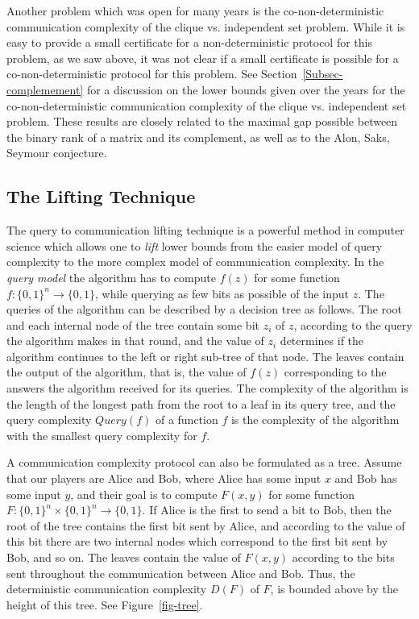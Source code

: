 \documentclass[11pt]{article}
\begin{document}
Another problem which was open for many years is the co-non-deterministic communication complexity of
the clique vs. independent set problem. While it is easy to provide a small certificate for a non-deterministic protocol for this problem, as we saw above,
it was not clear if a small certificate is possible for a co-non-deterministic protocol for this problem.
See Section~\ref{Subsec-complemement} for a discussion on the lower bounds given over the years for the co-non-deterministic communication complexity of
the clique vs. independent set problem. These results are closely related to the maximal gap possible between the binary rank of a matrix and its complement,
as well as to the Alon, Saks, Seymour conjecture.


\subsection{The Lifting Technique}
\label{subsec-lifting}
The query to communication lifting technique is a powerful method in computer science which allows one to {\em lift} lower bounds from the easier model of query complexity
to the more complex model of communication complexity.
In the {\em query model} the algorithm has to compute $f(z)$ for some function $f:\{0,1\}^n \rightarrow \{0,1\}$, while querying as few bits as possible of the input $z$.
The queries of the algorithm can be described by a decision tree as follows.
The root and each internal node of the tree contain some bit $z_i$ of $z$, according to the query the algorithm makes in that round,
and the value of $z_i$ determines if the algorithm continues to the left or right sub-tree of that node.
The leaves contain the output of the algorithm, that is, the value of $f(z)$ corresponding to the answers the algorithm received for its queries.
The complexity of the algorithm is the length of the longest path from the root to a leaf in its query tree, and the query complexity $Query(f)$ of a function $f$
is the complexity of the algorithm with the smallest query complexity for $f$.

A communication complexity protocol can also be formulated as a tree.
Assume that our players are Alice and Bob, where Alice has some input $x$ and Bob has some input $y$,
and their goal is to compute $F(x,y)$ for some function $F:\{0,1\}^n \times \{0,1\}^n \rightarrow \{0,1\}$.
If  Alice is the first to send a bit to Bob, then the root of the tree contains the first bit sent by Alice, and according to the value of this bit
there are two internal nodes which correspond to the first bit sent by Bob, and so on.
The leaves contain the value of $F(x,y)$ according to the bits sent throughout the communication between Alice and Bob.
Thus, the deterministic communication complexity $D(F)$ of $F$, is bounded above by the height of this tree. See Figure~\ref{fig-tree}.
\end{document}
